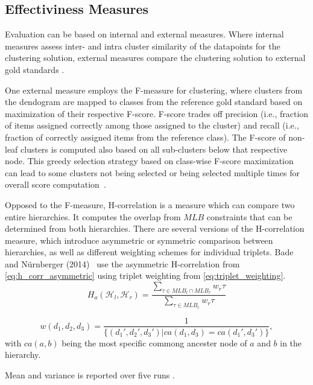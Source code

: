 
\subsection{Effectiviness Measures}
\label{subsec:effectiveness_measures}

Evaluation can be based on internal and external measures.
Where internal measures assess inter- and intra cluster similarity of the datapoints for the clustering solution, external measures compare the clustering solution to external gold standards \cite{bade_hierarchical_2014}.

One external measure employs the F-measure for clustering, where clusters from the dendogram are mapped to classes from the reference gold standard based on maximization of their respective F-score.
F-score trades off precision (i.e., fraction of items assigned correctly among those assigned to the cluster) and recall (i.e., fraction of correctly assigned items from the reference class).
The F-score of non-leaf clusters is computed also based on all sub-clusters below that respective node.
This greedy selection strategy based on class-wise F-score maximization can lead to some clusters not being selected or being selected multiple times for overall score computation~\cite{bade_hierarchical_2014}.

Opposed to the F-measure, H-correlation is a measure which can compare two entire hierarchies.
It computes the overlap from $MLB$ constraints that can be determined from both hierarchies.
There are several versions of the H-correlation measure, which introduce asymmetric or symmetric comparison between hierarchies, as well as different weighting schemes for individual triplets.
Bade and Nürnberger (2014)~\cite{bade_hierarchical_2014} use the asymmetric H-correlation from \eqref{eq:h_corr_asymmetric} using triplet weighting from \eqref{eq:triplet_weighting}.
\begin{equation}\label{eq:h_corr_asymmetric}
    H_a ( \mathcal{H}_l, \mathcal{H}_r) = \frac{\sum_{\tau \in MLB_l \cap MLB_r} w_r \tau}{\sum_{\tau \in MLB_r}w_r \tau}
\end{equation}

\begin{equation}\label{eq:triplet_weighting}
    w ( d_1, d_2, d_3) = \frac{1}{\{(d_1', d_2', d_3') | ca(d_1, d_3) = ca(d_1', d_3')\}},
\end{equation}
with $ca(a,b)$ being the most specific commong ancester node of $a$ and $b$ in the hierarchy.

Mean and variance is reported over five runs \cite{bade_hierarchical_2014}.
